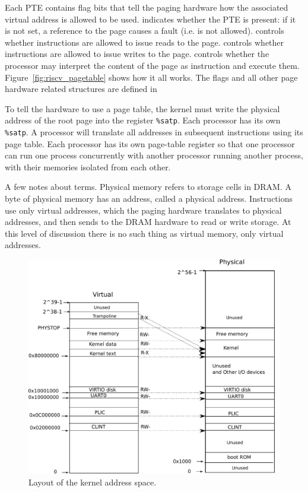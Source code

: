 Each PTE contains flag bits that tell the paging hardware
how the associated virtual address is allowed to be used.
indicates whether the PTE is present: if it is
not set, a reference to the page causes a fault (i.e. is not allowed).
controls whether instructions are allowed to issue
reads to the page.
controls whether instructions are allowed to issue
writes to the page.
controls whether the processor may interpret the content
of the page as instruction and execute them.
Figure~\ref{fig:riscv_pagetable}
shows how it all works.
The flags and all other page hardware related structures are defined in

To tell the hardware to use a page table, the kernel must
write the physical address of the root page into the register
\texttt{\%satp}.
Each processor has its own
\texttt{\%satp}.
A processor will translate all addresses in subsequent instructions
using its page table.
Each processor has its own page-table register so that one processor
can run one process concurrently with another processor running
another process, with their memories isolated from each other.

A few notes about terms.
Physical memory refers to storage cells in DRAM.
A byte of physical memory has an address, called a physical address.
Instructions use only virtual addresses, which the
paging hardware translates to physical addresses, and then
sends to the DRAM hardware to read or write storage.
At this level of discussion there is no such thing as virtual memory,
only virtual addresses.

\begin{figure}[t]
\center
\includegraphics[scale=0.5]{fig/xv6_layout.pdf}
\caption{Layout of the kernel address space.}
\label{fig:xv6_layout}
\end{figure}
